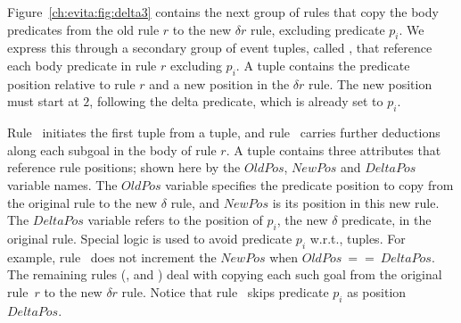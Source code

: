 Figure~\ref{ch:evita:fig:delta3} contains the next group of rules that copy the
body predicates from the old rule $r$ to the new $\delta r$ rule, excluding
predicate $p_i$.  We express this through a secondary group of event tuples,
called , that reference each body predicate in rule $r$ excluding
$p_i$.  A  tuple contains the predicate position relative to rule 
$r$ and a new position in the $\delta r$ rule.  The new position must start at 
$2$, following the delta predicate, which is already set to $p_i$.  

Rule~ initiates the first  tuple from a 
tuple, and rule~ carries further  deductions along each
subgoal in the body of rule $r$.  A  tuple contains three
attributes that reference rule positions; shown here by the $OldPos$, $NewPos$
and $DeltaPos$ variable names.  The $OldPos$ variable specifies the predicate
position to copy from the original rule to the new $\delta$ rule, and $NewPos$
is its position in this new rule.  The $DeltaPos$ variable refers to the
position of $p_i$, the new $\delta$ predicate, in the original rule.  Special
logic is used to avoid predicate $p_i$ w.r.t.,  tuples.  For
example, rule~ does not increment the $NewPos$ when $OldPos\ ==\
DeltaPos$.  The remaining rules (,  and ) deal with
copying each such goal from the original rule~$r$ to the new $\delta r$ rule.
Notice that rule~\ol{d7} skips predicate $p_i$ as position $DeltaPos$.

